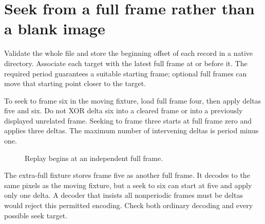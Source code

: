 \section{Seek from a full frame rather than a blank image}
Validate the whole file and store the beginning offset of each record in a native
directory. Associate each target with the latest full frame at or before it. The
required period guarantees a suitable starting frame; optional full frames can move
that starting point closer to the target.

To seek to frame six in the moving fixture, load full frame four, then apply deltas
five and six. Do not XOR delta six into a cleared frame or into a previously displayed
unrelated frame. Seeking to frame three starts at full frame zero and applies three
deltas. The maximum number of intervening deltas is period minus one.

\begin{figure}[htbp]
  \centering
  \caption{Replay begins at an independent full frame.}
\end{figure}

The extra-full fixture stores frame five as another full frame. It decodes to the
same pixels as the moving fixture, but a seek to six can start at five and apply only
one delta. A decoder that insists all nonperiodic frames must be deltas would reject
this permitted encoding. Check both ordinary decoding and every possible seek target.
